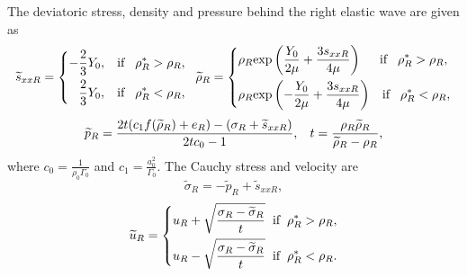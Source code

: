 \documentclass{article}
\numberwithin{equation}{section}
\numberwithin{table}{section}
\begin{document}
The deviatoric stress, density and pressure behind the right elastic wave are given as
\begin{equation}
  \widetilde{s}_{xxR} =\left\{ \begin{aligned}
	  -\frac{2}{3}Y_0, \hspace{0.3cm} \text{if} \hspace{0.3cm} \rho_R^* > \rho_R,\\
	  \frac{2}{3}Y_0, \hspace{0.3cm} \text{if} \hspace{0.3cm} \rho_R^* < \rho_R,\\
	\end{aligned}\right.
	\hspace{0.2cm} \widetilde{\rho}_{R} = \left\{ \begin{aligned}
	  & \rho_R \text{exp}\left(\frac{Y_0}{2\mu}+\frac{3 s_{xxR}}{4\mu}\right)  \hspace{0.5cm} \text{if} \hspace{0.3cm} \rho_R^* > \rho_R,\\
& \rho_R \text{exp}\left(-\frac{Y_0}{2\mu}+\frac{3 s_{xxR}}{4\mu}\right)
\hspace{0.3cm} \text{if} \hspace{0.3cm} \rho_R^* < \rho_R,\\
  \end{aligned}\right.
 \end{equation}
\begin{equation}
  \widetilde{p}_R= \frac{2t(c_1f(\widetilde{\rho}_R)+e_R)-(\sigma_R+\widetilde{s}_{xxR})}{2tc_0-1}, \hspace{0.3cm}
t=\frac{\rho_R \widetilde{\rho}_R}{\widetilde{\rho}_R-\rho_R},
\end{equation}
where $c_0 =\frac{1}{\rho_0 \Gamma_0}$ and $c_1 = \frac{a_0^2}{\Gamma_0}$.
The Cauchy stress and velocity are
\begin{equation}
\widetilde{\sigma}_R = -\widetilde{p}_R+\widetilde{s}_{xxR},
\end{equation}
\begin{equation}
  \widetilde{u}_R= \left\{
  \begin{aligned}
	u_R+\sqrt{\frac{\sigma_R-\widetilde{\sigma}_R}{t}} \hspace{0.2cm} \text{if} \hspace{0.2cm} \rho_R^* >\rho_R,\\
	u_R-\sqrt{\frac{\sigma_R-\widetilde{\sigma}_R}{t}} \hspace{0.2cm} \text{if} \hspace{0.2cm} \rho_R^* <\rho_R.\\
\end{aligned} \right.
\end{equation}
\end{document}
